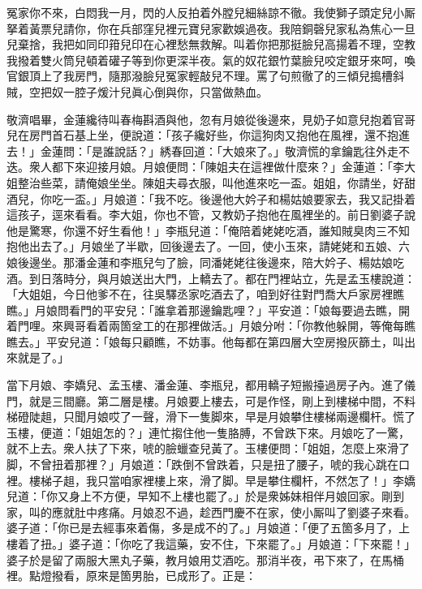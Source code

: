 \begin{myquote} 
冤家你不來，白悶我一月，閃的人反拍着外膛兒細絲諒不徹。我使獅子頭定兒小厮拏着黃票兒請你，你在兵部窪兒裡元寶兒家歡娛過夜。我陪銅磬兒家私為焦心一旦兒棄捨，我把如同印箝兒印在心裡愁無救解。叫着你把那挺臉兒高揚着不理，空教我撥着雙火筒兒頓着礶子等到你更深半夜。氣的奴花銀竹葉臉兒咬定銀牙來呵，喚官銀頂上了我房門，隨那潑臉兒冤家輕敲兒不理。罵了句煎徹了的三傾兒搗槽斜賊，空把奴一腔子煖汁兒眞心倒與你，只當做熱血。
\end{myquote} 

敬濟唱畢，金蓮纔待叫春梅斟酒與他，忽有月娘從後邊來，見奶子如意兒抱着官哥兒在房門首石基上坐，便說道：「孩子纔好些，你這狗肉又抱他在風裡，還不抱進去！」金蓮問：「是誰說話？」綉春回道：「大娘來了。」敬濟慌的拿鑰匙往外走不迭。衆人都下來迎接月娘。月娘便問：「陳姐夫在這裡做什麼來？」金蓮道：「李大姐整治些菜，請俺娘坐坐。{}陳姐夫尋衣服，叫他進來吃一盃。姐姐，你請坐，好甜酒兒，你吃一盃。」月娘道：「我不吃。後邊他大妗子和楊姑娘要家去，我又記掛着這孩子，逕來看看。李大姐，你也不管，又教奶子抱他在風裡坐的。前日劉婆子說他是驚寒，你還不好生看他！」李瓶兒道：「俺陪着姥姥吃酒，誰知賊臭肉三不知抱他出去了。」月娘坐了半歇，回後邊去了。一回，使小玉來，請姥姥和五娘、六娘後邊坐。那潘金蓮和李瓶兒勻了臉，同潘姥姥往後邊來，陪大妗子、楊姑娘吃酒。到日落時分，與月娘送出大門，上轎去了。都在門裡站立，先是孟玉樓說道：「大姐姐，今日他爹不在，往吳驛丞家吃酒去了，咱到好往對門喬大戶家房裡瞧瞧。」月娘問看門的平安兒：「誰拿着那邊鑰匙哩？」平安道：「娘每要過去瞧，開着門哩。來興哥看着兩箇坌工的在那裡做活。」月娘分咐：「你教他躲開，等俺每瞧瞧去。」平安兒道：「娘每只顧瞧，不妨事。他每都在第四層大空房撥灰篩土，叫出來就是了。」

當下月娘、李嬌兒、孟玉樓、潘金蓮、李瓶兒，都用轎子短搬擡過房子內。進了儀門，就是三間廳。第二層是樓。月娘要上樓去，可是作怪，剛上到樓梯中間，不料梯磴陡趄，只聞月娘哎了一聲，滑下一隻脚來，早是月娘攀住樓梯兩邊欄杆。慌了玉樓，便道：「姐姐怎的？」連忙搊住他一隻胳膊，不曾跌下來。月娘吃了一驚，就不上去。衆人扶了下來，唬的臉蠟查兒黃了。玉樓便問：「姐姐，怎麼上來滑了脚，不曾扭着那裡？」月娘道：「跌倒不曾跌着，只是扭了腰子，唬的我心跳在口裡。樓梯子趄，我只當咱家裡樓上來，滑了脚。早是攀住欄杆，不然怎了！」李嬌兒道：「你又身上不方便，早知不上樓也罷了。」於是衆姊妹相伴月娘回家。剛到家，叫的應就肚中疼痛。月娘忍不過，趁西門慶不在家，使小厮叫了劉婆子來看。婆子道：「你已是去經事來着傷，多是成不的了。」月娘道：「便了五箇多月了，上樓着了扭。」婆子道：「你吃了我這藥，安不住，下來罷了。」{}月娘道：「下來罷！」婆子於是留了兩服大黑丸子藥，教月娘用艾酒吃。那消半夜，弔下來了，在馬桶裡。點燈撥看，原來是箇男胎，已成形了。正是：

